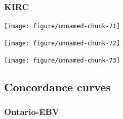 \documentclass[12pt]{article}
\begin{document}
\subsubsection{KIRC}

\begin{knitrout}
\color{fgcolor}\begin{kframe}
\begin{alltt}
\hlstd{(} \hlstd{));}
\hlstd{(}\hlstd{=}\hlstd{)}
\end{alltt}
\end{kframe}
\texttt{[image: figure/unnamed-chunk-71]} 

\texttt{[image: figure/unnamed-chunk-72]} 

\texttt{[image: figure/unnamed-chunk-73]} 

\end{knitrout}


\subsection{Concordance curves}

\subsubsection{Ontario-EBV}
\end{document}

